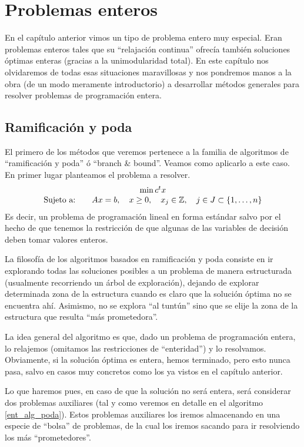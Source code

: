 \chapter{Problemas enteros}
\label{ent}
En el capítulo anterior vimos un tipo de problema entero muy especial. Eran problemas enteros tales que su ``relajación continua'' ofrecía también soluciones óptimas enteras (gracias a la unimodularidad total). En este capítulo nos olvidaremos de todas esas situaciones maravillosas y nos pondremos manos a la obra (de un modo meramente introductorio) a desarrollar métodos generales para resolver problemas de programación entera.
\section{Ramificación y poda}
El primero de los métodos que veremos pertenece a la familia de algoritmos de ``ramificación y poda'' ó ``branch \& bound''. Veamos como aplicarlo a este caso. En primer lugar planteamos el problema a resolver.
\begin{equation*}
	\begin{array}{c}
		\min c^tx\\
		\text{Sujeto a:}\qquad Ax= b,\quad x\geq 0,\quad x_j\in\mathbb{Z},\quad j\in J\subset\{1,\dots,n\} 
	\end{array}
\end{equation*}
Es decir, un problema de programación lineal en forma estándar salvo por el hecho de que tenemos la restricción de que algunas de las variables de decisión deben tomar valores enteros.
\begin{obs}[Filosofía]
	La filosofía de los algoritmos basados en ramificación y poda consiste en ir explorando todas las soluciones posibles a un problema de manera estructurada (usualmente recorriendo un árbol de exploración), dejando de explorar determinada zona de la estructura cuando es claro que la solución óptima no se encuentra ahí. Asimismo, no se explora ``al tuntún'' sino que se elije la zona de la estructura que resulta ``más prometedora''.
\end{obs}
La idea general del algoritmo es que, dado un problema de programación entera, lo relajemos (omitamos las restricciones de ``enteridad'') y lo resolvamos. Obviamente, si la solución óptima es entera, hemos terminado, pero esto nunca pasa, salvo en casos muy concretos como los ya vistos en el capítulo anterior.

Lo que haremos pues, en caso de que la solución no será entera, será considerar dos problemas auxiliares (tal y como veremos en detalle en el algoritmo \ref{ent_alg_poda}). Estos problemas auxiliares los iremos almacenando en una especie de ``bolsa'' de problemas, de la cual los iremos sacando para ir resolviendo los más ``prometedores''.

